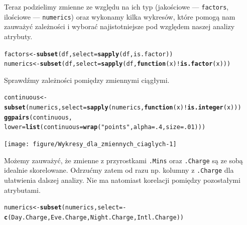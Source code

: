 \documentclass{article}\usepackage[]{graphicx}\usepackage[]{color}
\makeatletter
\newcommand{\hlnum}[1]{\textcolor[rgb]{0.686,0.059,0.569}{#1}}%
\newcommand{\hlstr}[1]{\textcolor[rgb]{0.192,0.494,0.8}{#1}}%
\newcommand{\hlopt}[1]{\textcolor[rgb]{0,0,0}{#1}}%
\newcommand{\hlstd}[1]{\textcolor[rgb]{0.345,0.345,0.345}{#1}}%
\newcommand{\hlkwa}[1]{\textcolor[rgb]{0.161,0.373,0.58}{\textbf{#1}}}%
\newcommand{\hlkwb}[1]{\textcolor[rgb]{0.69,0.353,0.396}{#1}}%
\newcommand{\hlkwc}[1]{\textcolor[rgb]{0.333,0.667,0.333}{#1}}%
\newcommand{\hlkwd}[1]{\textcolor[rgb]{0.737,0.353,0.396}{\textbf{#1}}}%
\newenvironment{kframe}{%
 \def\at@end@of@kframe{}%
 \ifinner\ifhmode%
  \def\at@end@of@kframe{\end{minipage}}%
  \begin{minipage}{\columnwidth}%
 \fi\fi%
 \def\FrameCommand##1{\hskip\@totalleftmargin \hskip-\fboxsep
 \colorbox{shadecolor}{##1}\hskip-\fboxsep
     \hskip-\linewidth \hskip-\@totalleftmargin \hskip\columnwidth}%
 \MakeFramed {\advance\hsize-\width
   \@totalleftmargin\z@ \linewidth\hsize
   \@setminipage}}%
 {\par\unskip\endMakeFramed%
 \at@end@of@kframe}
\newenvironment{knitrout}{}{} %
\makeatother
\begin{document}
Teraz podzielimy zmienne ze względu na ich typ (jakościowe --- \verb|factors|, ilościowe --- \verb|numerics|) oraz wykonamy kilka wykresów, które pomogą nam zauważyć zależności i wyborać najistotniejsze pod względem naszej analizy atrybuty.
\begin{knitrout}
\color{fgcolor}\begin{kframe}
\begin{alltt}
\hlstd{factors} \hlkwb{<-} \hlkwd{subset}\hlstd{(df,} \hlkwc{select}\hlstd{=}\hlkwd{sapply}\hlstd{(df, is.factor))}
\hlstd{numerics} \hlkwb{<-} \hlkwd{subset}\hlstd{(df,} \hlkwc{select}\hlstd{=}\hlkwd{sapply}\hlstd{(df,} \hlkwa{function}\hlstd{(}\hlkwc{x}\hlstd{)} \hlopt{!}\hlkwd{is.factor}\hlstd{(x)))}
\end{alltt}
\end{kframe}
\end{knitrout}

Sprawdźmy zależności pomiędzy zmiennymi ciągłymi.


\begin{knitrout}
\color{fgcolor}\begin{kframe}
\begin{alltt}
\hlstd{continuous} \hlkwb{<-} \hlkwd{subset}\hlstd{(numerics,} \hlkwc{select}\hlstd{=}\hlkwd{sapply}\hlstd{(numerics,} \hlkwa{function}\hlstd{(}\hlkwc{x}\hlstd{)} \hlopt{!}\hlkwd{is.integer}\hlstd{(x)))}
\hlkwd{ggpairs}\hlstd{(continuous,}
        \hlkwc{lower}\hlstd{=}\hlkwd{list}\hlstd{(}\hlkwc{continuous}\hlstd{=}\hlkwd{wrap}\hlstd{(}\hlstr{"points"}\hlstd{,} \hlkwc{alpha}\hlstd{=}\hlnum{.4}\hlstd{,} \hlkwc{size}\hlstd{=}\hlnum{.01}\hlstd{)))}
\end{alltt}
\end{kframe}

{\centering \texttt{[image: figure/Wykresy\_dla\_zmiennych\_ciaglych-1]} 

}



\end{knitrout}
Możemy zauważyć, że zmienne z przyrostkami \verb|.Mins| oraz \verb|.Charge| są ze sobą idealnie skorelowane. Odrzućmy zatem od razu np. kolumny z \verb|.Charge| dla ułatwienia dalszej analizy. Nie ma natomiast korelacji pomiędzy pozostałymi atrybutami.

\begin{knitrout}
\color{fgcolor}\begin{kframe}
\begin{alltt}
\hlstd{numerics} \hlkwb{<-} \hlkwd{subset}\hlstd{(numerics,} \hlkwc{select}\hlstd{=}\hlopt{-}\hlkwd{c}\hlstd{(Day.Charge, Eve.Charge, Night.Charge, Intl.Charge))}
\end{alltt}
\end{kframe}
\end{knitrout}
\end{document}
